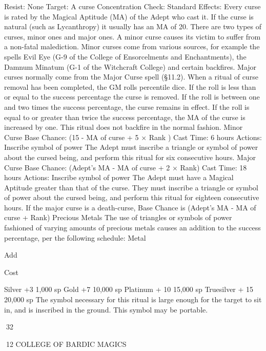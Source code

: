 \documentclass[a4paper]{article}
\begin{document}
\begin{multicols}{3}
Resist: None
Target: A curse
Concentration Check: Standard
Effects: Every curse is rated by the Magical Aptitude (MA) of the Adept who cast it. If the curse is
natural (such as Lycanthropy) it usually has an MA
of 20.
There are two types of curses, minor ones and
major ones. A minor curse causes its victim to
suffer from a non-fatal malediction. Minor curses
come from various sources, for example the spells
Evil Eye (G-9 of the College of Ensorcelments and
Enchantments), the Damnum Minatum (G-1 of the
Witchcraft College) and certain backfires. Major
curses normally come from the Major Curse spell
(§11.2).
When a ritual of curse removal has been completed, the GM rolls percentile dice. If the roll is
less than or equal to the success percentage the
curse is removed. If the roll is between one and
two times the success percentage, the curse remains in effect. If the roll is equal to or greater than
twice the success percentage, the MA of the curse
is increased by one. This ritual does not backfire in
the normal fashion.
Minor Curse
Base Chance: (15 - MA of curse + 5 × Rank )%
Cast Time: 6 hours
Actions: Inscribe symbol of power
The Adept must inscribe a triangle or symbol of
power about the cursed being, and perform this
ritual for six consecutive hours.
Major Curse
Base Chance: (Adept’s MA - MA of curse + 2 ×
Rank)%
Cast Time: 18 hours
Actions: Inscribe symbol of power
The Adept must have a Magical Aptitude greater
than that of the curse. They must inscribe a triangle
or symbol of power about the cursed being, and
perform this ritual for eighteen consecutive hours.
If the major curse is a death-curse, Base Chance is
(Adept’s MA - MA of curse + Rank)%
Precious Metals The use of triangles or symbols
of power fashioned of varying amounts of precious
metals causes an addition to the success percentage, per the following schedule:
Metal

Add

Cost

Silver
+3
1,000 sp
Gold
+7
10,000 sp
Platinum
+ 10 15,000 sp
Truesilver + 15 20,000 sp
The symbol necessary for this ritual is large
enough for the target to sit in, and is inscribed in
the ground. This symbol may be portable.

32

12 COLLEGE OF BARDIC MAGICS


\end{multicols}
\end{document}
